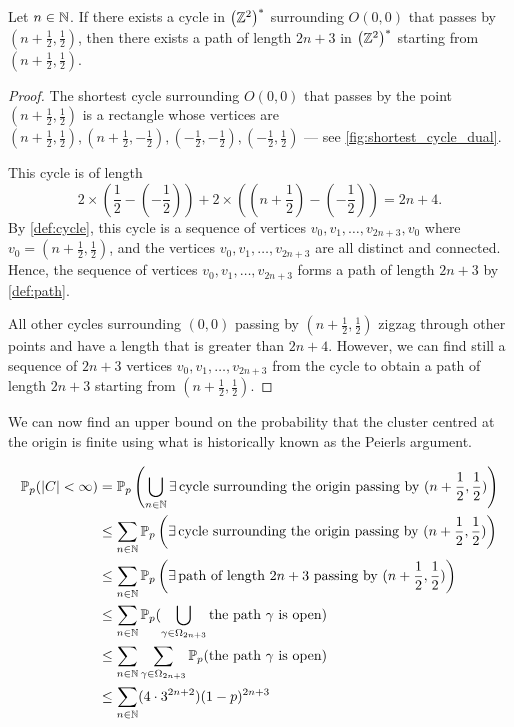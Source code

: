 \documentclass[a4paper, 12pt]{article}
\begin{document}
\begin{prop}\label{prop:cylce_implies_path}
Let $n \in \mathbb{N}$. If there exists a cycle in $\left(\mathbb{Z}^2\right)^*$ surrounding $O(0, 0)$ that passes by $(n + \frac{1}{2}, \frac{1}{2})$, then there exists a path of length $2n + 3$ in $\left(\mathbb{Z}^2\right)^*$ starting from $(n + \frac{1}{2}, \frac{1}{2})$.
\end{prop}
\begin{proof}
    The shortest cycle surrounding $O(0, 0)$ that passes by the point $(n + \frac{1}{2}, \frac{1}{2})$ is a rectangle whose vertices are $(n + \frac{1}{2}, \frac{1}{2}), (n + \frac{1}{2}, -\frac{1}{2}), (-\frac{1}{2}, -\frac{1}{2}), (-\frac{1}{2}, \frac{1}{2})$ --- see \cref{fig:shortest_cycle_dual}.
    
    
    This cycle is of length \[2 \times \left( \frac{1}{2} - (-\frac{1}{2})\right) + 2 \times \left((n + \frac{1}{2}) - (-\frac{1}{2})\right) = 2n + 4.\]
    By \cref{def:cycle}, this cycle is a sequence of vertices $v_0, v_1, \dots, v_{2n + 3}, v_{0}$ where $v_0 = (n + \frac{1}{2}, \frac{1}{2})$, and the vertices $v_0, v_1, \dots, v_{2n + 3}$ are all distinct and connected. Hence, the sequence of vertices $v_0, v_1, \dots, v_{2n + 3}$ forms a path of length $2n + 3$ by \cref{def:path}. 
    
All other cycles surrounding $(0, 0)$ passing by $(n + \frac{1}{2}, \frac{1}{2})$ zigzag through other points and have a length that is greater than $2n + 4$. However, we can find still a sequence of $2n + 3$ vertices $v_0, v_1, \dots, v_{2n + 3}$ from the cycle to obtain a path of length $2n + 3$ starting from $(n + \frac{1}{2}, \frac{1}{2})$.
\end{proof}

We can now find an upper bound on the probability that the cluster centred at the origin is finite using what is historically known as the Peierls argument.

\begin{align}
    \mathbb{P}_p(\lvert C \rvert < \infty)
    &= \mathbb{P}_p\left(\bigcup_{n \in \mathbb{N}} \exists\,\text{cycle surrounding the origin passing by } (n + \frac{1}{2}, \frac{1}{2})\right)\label{eq:union_exists_cycle}\\
    &\leq \sum_{n \in \mathbb{N}} \mathbb{P}_p\left(\exists\,\text{cycle surrounding the origin passing by } (n + \frac{1}{2}, \frac{1}{2})\right)\label{eq:sum_exists_cycle}\\
    & \leq \sum_{n \in \mathbb{N}} \mathbb{P}_p\left(\exists\,\text{path of length } 2n + 3 \text{ passing by }(n + \frac{1}{2}, \frac{1}{2})\right)\label{eq:sum_exists_path}\\
    &\leq \sum_{n \in \mathbb{N}} \mathbb{P}_p(\bigcup_{\gamma \in \Omega_{2n + 3}} \text{the path } \gamma \text{ is open})\label{eq:sum_union_exists_path}\\
    &\leq \sum_{n \in \mathbb{N}} \sum_{\gamma \in \Omega_{2n + 3}} \mathbb{P}_p(\text{the path } \gamma \text{ is open})\label{eq:sum_sum_path_open}\\
    &\leq \sum_{n \in \mathbb{N}} (4 \cdot 3^{2n + 2}) (1 - p)^{2n + 3}\label{eq:sum_path_open}
\end{align}
\end{document}

